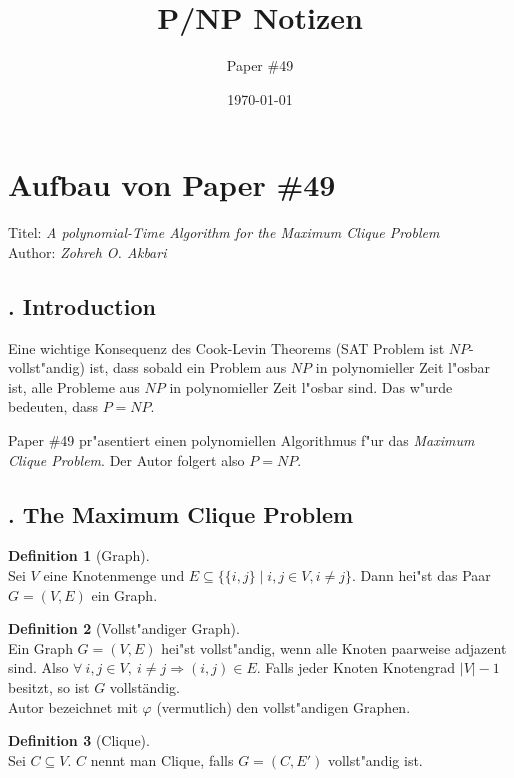 \documentclass[12pt, xcolor=dvipsnames]{scrartcl}
\title{P/NP Notizen}
\subtitle{Paper \#49}
\date{\today}
\theoremstyle{definition}
\newtheorem{definition}{Definition}%
\theoremstyle{definition}
\begin{document}
\maketitle

\newpage

\section*{Aufbau von Paper \#49}
Titel: \textit{A polynomial-Time Algorithm for the Maximum Clique Problem} \\
Author: \textit{Zohreh O. Akbari} \\

\subsection*{. Introduction}
Eine wichtige Konsequenz des Cook-Levin Theorems (SAT Problem ist $NP$-vollst"andig) ist, dass sobald ein Problem aus $NP$ in polynomieller Zeit l"osbar ist, alle Probleme aus $NP$ in polynomieller Zeit l"osbar sind. Das w"urde bedeuten, dass $P = NP$.

Paper \#49 pr"asentiert einen polynomiellen Algorithmus f"ur das \textit{Maximum Clique Problem}. Der Autor folgert also $P = NP$.

\subsection*{. The Maximum Clique Problem}

\begin{definition}[Graph]\ \\
    Sei $V$ eine Knotenmenge und $E \subseteq \{ \{i,j\} \mid i,j \in V, i \neq j\}$. Dann hei"st das Paar $G = (V,E)$ ein Graph.
\end{definition}

\begin{definition}[Vollst"andiger Graph]\ \\
    Ein Graph $G = (V,E)$ hei"st vollst"andig, wenn alle Knoten paarweise adjazent sind. Also $\forall ~ i,j \in V,~ i \neq j \Longrightarrow (i,j) \in E$. Falls jeder Knoten Knotengrad $|V|-1$ besitzt, so ist $G$ vollständig.\\
    Autor bezeichnet mit $\varphi$ (vermutlich) den vollst"andigen Graphen.
\end{definition}

\begin{definition}[Clique]\ \\
    Sei $C \subseteq V$. $C$ nennt man Clique, falls $G = (C,E')$ vollst"andig ist.
\end{definition}
\end{document}
